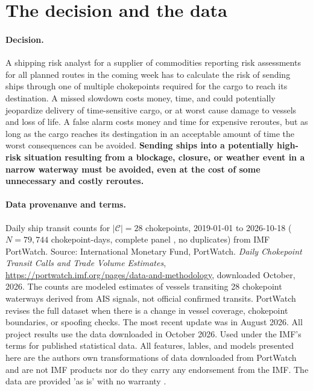 \documentclass[11pt]{article}
\begin{document}
\section{The decision and the data}  %
\paragraph{Decision.}
A shipping risk analyst for a supplier of commodities reporting risk assessments for all planned routes in the coming week has to calculate the risk of sending ships through one of multiple chokepoints required for the cargo to reach its destination. 
A missed slowdown costs money, time, and could potentially jeopardize delivery of time-sensitive cargo, or at worst cause damage to vessels and loss of life. A false alarm costs money and time for expensive reroutes, but as long as the cargo reaches its destingation in an acceptable amount of time the worst consequences can be avoided. \textbf{Sending ships into a potentially high-risk situation resulting from a blockage, closure, or weather event in a narrow waterway must be avoided, even at the cost of some unnecessary and costly reroutes.}  

\paragraph{Data provenanve and terms.}
Daily ship transit counts for $|\mathcal{C}|=28$ chokepoints, 2019-01-01 to 2026-10-18 ($N=79{,}744$ chokepoint-days, complete panel \cite{alam}, no duplicates) from IMF PortWatch. Source: International Monetary Fund, PortWatch. \emph{Daily Chokepoint Transit Calls and Trade Volume Estimates}, \url{https://portwatch.imf.org/pages/data-and-methodology}, downloaded October, 2026. The counts are modeled estimates of vessels transiting 28 chokepoint waterways derived from AIS signals, not official confirmed transits. PortWatch revises the full dataset when there is a change in vessel coverage, chokepoint boundaries, or spoofing checks. The most recent update was in August 2026. All project results use the data downloaded in October 2026. Used under the IMF's terms for published statistical data. All features, lables, and models presented here are the authors own transformations of data downloaded from PortWatch and are not IMF products nor do they carry any endorsement from the IMF. The data are provided 'as is' with no warranty \cite{imfterms}. 
\end{document}
